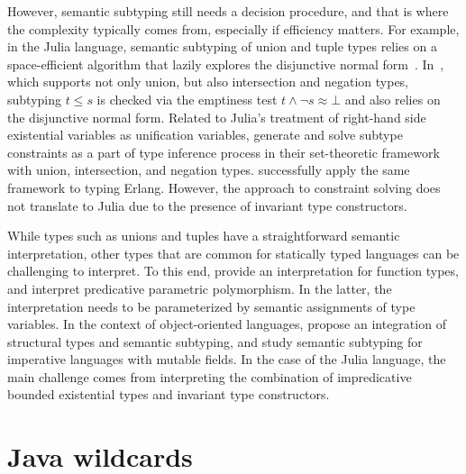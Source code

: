 However, semantic subtyping still needs a decision procedure, and that is where
the complexity typically comes from, especially if efficiency matters.
For example, in the Julia language, semantic subtyping of union and tuple types
relies on a space-efficient algorithm that lazily explores the disjunctive
normal form~\cite{chung:julia-sub-algo:2019}.
In~\cite{frisch:sem-sub:2002}, which supports not only union, but also
intersection and negation types, subtyping $t \leq s$ is checked via
the emptiness test $t \land \lnot s \approx \bot$ and also relies on
the disjunctive normal form.
Related to Julia's treatment of right-hand side existential variables as 
unification variables, \citet{castagna:sem-poly-inf:2015} generate and solve
subtype constraints as a part of type inference process in their set-theoretic
framework with union, intersection, and negation types.
\citet{schimpf:set-types-erlang:2023} successfully apply the
same framework to typing Erlang.
However, the approach to constraint solving does not translate to Julia
due to the presence of invariant type constructors.%

While types such as unions and tuples have a straightforward
semantic interpretation, other types that are common for statically typed
languages can be challenging to interpret.
To this end, \citet{frisch:sem-sub:2002} provide an interpretation for
function types, and \citet{castagna:sem-poly:2011} interpret predicative
parametric polymorphism. In the latter, the interpretation needs to be
parameterized by semantic assignments of type variables.
In the context of object-oriented languages,
\citet{dardha:sem-sub-obj:2016} propose an integration of structural types and
semantic subtyping, and \citet{ancona:sem-sub-imp:2016} study semantic
subtyping for imperative languages with mutable fields.
In the case of the Julia language, %
the main challenge comes from interpreting the combination of
impredicative bounded existential types and invariant type constructors.

\section{Java wildcards}

